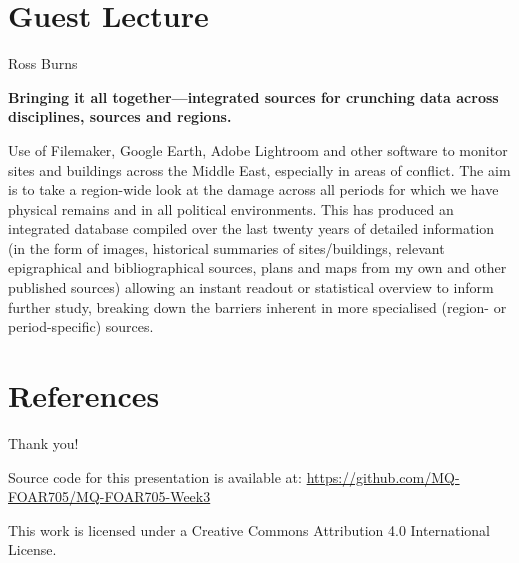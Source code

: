 \documentclass[aspectratio=1610, 11pt]{beamer} %
\begin{document}
\section{Guest Lecture}
\begin{frame}{Ross Burns}

{\bf Bringing it all together—integrated sources for crunching data across disciplines, sources and regions.}

Use of Filemaker, Google Earth, Adobe Lightroom and other software to monitor sites and buildings across the Middle East, especially in areas of conflict. The aim is to take a region-wide look at the damage across all periods for which we have physical remains and in all political environments. This has produced an integrated database compiled over the last twenty years of detailed information (in the form of images, historical summaries of sites/buildings, relevant epigraphical and bibliographical sources, plans and maps from my own and other published sources) allowing an instant readout or statistical overview to inform further study, breaking down the barriers inherent in more specialised (region- or period-specific) sources.
    
\end{frame}

\section{References}

\begin{multicols}{2}[]


\end{multicols}


  
%   
%   


\begin{frame}{Thank you!}


Source code for this presentation is available at: \url{https://github.com/MQ-FOAR705/MQ-FOAR705-Week3}

This work is licensed under a Creative Commons Attribution 4.0 International License.

\end{frame}
\end{document}
